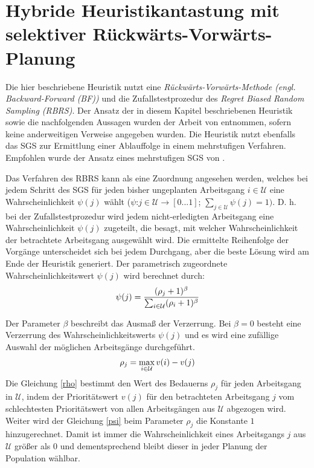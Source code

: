 \documentclass[a4paper,12pt,normalheadings,footexclude,headinclude,liststotoc,nochapterprefix,onecolumn,oneside,parskip,pointlessnumbers]{scrreprt}
\begin{document}
\section{Hybride Heuristikantastung mit selektiver Rückwärts-Vorwärts-Planung} \label{tormos}

Die hier beschriebene Heuristik nutzt eine \textit{Rückwärts-Vorwärts-Methode (engl. Backward-Forward (BF))} und die Zufallstestprozedur des \textit{Regret Biased Random Sampling (RBRS)}. Der Ansatz der in diesem Kapitel beschriebenen Heuristik sowie die nachfolgenden Aussagen wurden der Arbeit von \cite{tormos2003efficient} entnommen, sofern keine anderweitigen Verweise angegeben wurden. Die Heuristik nutzt ebenfalls das SGS zur Ermittlung einer Ablauffolge in einem mehrstufigen Verfahren. Empfohlen wurde der Ansatz eines mehrstufigen SGS von \cite{li1992iterative}. %


Das Verfahren des RBRS kann als eine Zuordnung angesehen werden, welches bei jedem Schritt des SGS für jeden bisher ungeplanten Arbeitsgang $i \in\mathcal{U}$ eine Wahrscheinlichkeit $\psi(j)$ wählt ($\psi$:$j$$\in$$\mathcal{U}$$\rightarrow$$[0...1]$; $\sum_{j \in \mathcal{U}}\psi(j)=1)$. D. h. bei der Zufallstestprozedur wird jedem nicht-erledigten Arbeitsgang eine Wahrscheinlichkeit $\psi(j)$ zugeteilt, die besagt, mit welcher Wahrscheinlichkeit der betrachtete Arbeitsgang ausgewählt wird. Die ermittelte Reihenfolge der Vorgänge unterscheidet sich bei jedem Durchgang, aber die beste Lösung wird am Ende der Heuristik generiert. Der parametrisch zugeordnete Wahrscheinlichkeitswert $\psi(j)$ wird berechnet durch:
\begin{eqnarray} \label{psi}
\psi(j) = \frac{(\rho_{j}+1)^{\beta}}{\sum_{i \in \mathcal{U}}(\rho_{i}+1)^{\beta}}\hfill  
\end{eqnarray}

Der Parameter $\beta$ beschreibt das Ausmaß der Verzerrung. Bei $\beta=0$ besteht eine Verzerrung des Wahrscheinlichkeitswerts $\psi(j)$ und es wird eine zufällige Auswahl der möglichen Arbeitsgänge durchgeführt.
\begin{eqnarray} \label{rho}
\rho_{j} = \max_{i \in \mathcal{U}} v(i) - v(j)\hfill  
\end{eqnarray}
Die Gleichung \eqref{rho} bestimmt den Wert des Bedauerns $\rho_{j}$ für jeden Arbeitsgang in $\mathcal{U}$, indem der Prioritätswert $v(j)$ für den betrachteten Arbeitsgang $j$ vom schlechtesten Prioritätswert von allen Arbeitsgängen aus $\mathcal{U}$ abgezogen wird. %
Weiter wird der Gleichung \eqref{psi} beim Parameter $\rho_{j}$ die Konstante $1$ hinzugerechnet. Damit ist immer die Wahrscheinlichkeit eines Arbeitsgangs $j$ aus $\mathcal{U}$ größer als $0$ und dementsprechend bleibt dieser in jeder Planung der Population wählbar.
\end{document}
